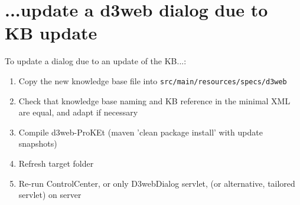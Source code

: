 \documentclass[a4paper,10pt]{scrreprt}
\begin{document}
\section{...update a d3web dialog due to KB update}
To update a dialog due to an update of the KB...:
\begin{enumerate}
	\item Copy the new knowledge base file into  \texttt{src/main/resources/specs/d3web} 
	\item Check that knowledge base naming and KB reference in the minimal XML are equal, and adapt if necessary
	\item Compile d3web-ProKEt (maven 'clean package install' with update snapshots)
	\item Refresh target folder
	\item Re-run ControlCenter, or only D3webDialog servlet, (or alternative, tailored servlet) on server
\end{enumerate}
\end{document}
